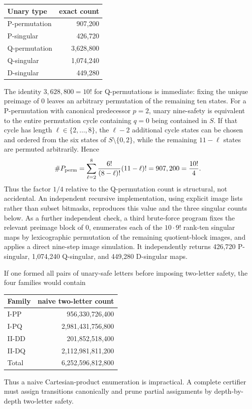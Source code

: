 \documentclass[11pt]{article}
\theoremstyle{definition}
\theoremstyle{remark}
\begin{document}
\begin{center}
\begin{tabular}{lr}
\toprule
Unary type & exact count\\
\midrule
P-permutation & 907,200\\
P-singular & 426,720\\
Q-permutation & 3,628,800\\
Q-singular & 1,074,240\\
D-singular & 449,280\\
\bottomrule
\end{tabular}
\end{center}

The identity $3,628,800=10!$ for Q-permutations is immediate: fixing the unique preimage of 0 leaves an arbitrary permutation of the remaining ten states. For a P-permutation with canonical predecessor $p=2$, unary nine-safety is equivalent to the entire permutation cycle containing $q=0$ being contained in $S$. If that cycle has length $\ell\in\{2,\ldots,8\}$, the $\ell-2$ additional cycle states can be chosen and ordered from the six states of $S\setminus\{0,2\}$, while the remaining $11-\ell$ states are permuted arbitrarily. Hence
\[
\#P_{\rm perm}=\sum_{\ell=2}^{8}\frac{6!}{(8-\ell)!}(11-\ell)!=907,200=\frac{10!}{4}.
\]
Thus the factor $1/4$ relative to the Q-permutation count is structural, not accidental. An independent recursive implementation, using explicit image lists rather than subset bitmasks, reproduces this value and the three singular counts below. As a further independent check, a third brute-force program fixes the relevant preimage block of $0$, enumerates each of the $10\cdot 9!$ rank-ten singular maps by lexicographic permutation of the remaining quotient-block images, and applies a direct nine-step image simulation. It independently returns 426,720 P-singular, 1,074,240 Q-singular, and 449,280 D-singular maps.

If one formed all pairs of unary-safe letters before imposing two-letter safety, the four families would contain
\begin{center}
\begin{tabular}{lr}
\toprule
Family & naive two-letter count\\
\midrule
I-PP & 956,330,726,400\\
I-PQ & 2,981,431,756,800\\
II-DD & 201,852,518,400\\
II-DQ & 2,112,981,811,200\\
\midrule
Total & 6,252,596,812,800\\
\bottomrule
\end{tabular}
\end{center}
Thus a naive Cartesian-product enumeration is impractical. A complete certifier must assign transitions canonically and prune partial assignments by depth-by-depth two-letter safety.
\end{document}
